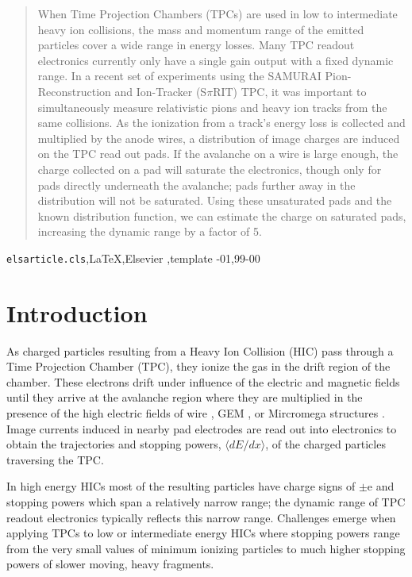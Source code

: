 \documentclass[review]{elsarticle}
\begin{document}
\begin{frontmatter}
\begin{abstract}
When Time Projection Chambers (TPCs) are used in low to intermediate heavy ion collisions, the mass and momentum range of the emitted particles cover a wide range in energy losses. Many TPC readout electronics currently only have a single gain output with a fixed dynamic range. In a recent set of experiments using the SAMURAI Pion-Reconstruction and Ion-Tracker (S$\pi$RIT) TPC, it was important to simultaneously measure relativistic pions and heavy ion tracks from the same collisions. As the ionization from a track's energy loss is collected and multiplied by the anode wires, a distribution of image charges are induced on the TPC read out pads. If the avalanche on a wire is large enough, the charge collected on a pad will saturate the electronics, though only for pads directly underneath the avalanche; pads further away in the distribution will not be saturated. Using these unsaturated pads and the known distribution function, we can estimate the charge on saturated pads, increasing the dynamic range by a factor of 5.

\end{abstract}

\begin{keyword}
\texttt{elsarticle.cls}\sep \LaTeX\sep Elsevier \sep template
-01\sep  99-00
\end{keyword}

\end{frontmatter}

\linenumbers

\section{Introduction} 

As charged particles resulting from a Heavy Ion Collision (HIC) pass through a Time Projection Chamber (TPC), they ionize the gas in the drift region of the chamber. These electrons drift under influence of the electric and magnetic fields until they arrive at the avalanche region where they are multiplied in the presence of the high electric fields of wire \cite{blumrol}, GEM \cite{gem}, or Mircromega structures \cite{micromeg}. Image currents induced in nearby pad electrodes are read out into electronics to obtain the trajectories and stopping powers, $\langle dE/dx\rangle$, of the charged particles traversing the TPC.

In high energy HICs most of the resulting particles have charge signs of $\pm$e and stopping powers which span a relatively narrow range; the dynamic range of TPC readout electronics typically reflects this narrow range. Challenges emerge when applying TPCs to low or intermediate energy HICs where stopping powers range from the very small values of minimum ionizing particles to much higher stopping powers of slower moving, heavy fragments. 
\end{document}
